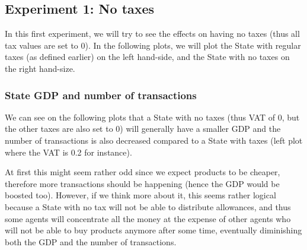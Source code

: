     \subsection{Experiment 1: No taxes}
    In this first experiment, we will try to see the effects on having no taxes (thus all tax values are set to 0). In the following plots, we will plot the State with regular taxes (as defined earlier) on the left hand-side, and the State with no taxes on the right hand-size. 

        \subsubsection{State GDP and number of transactions}

        We can see on the following plots that a State with no taxes (thus VAT of 0, but the other taxes are also set to 0) will generally have a smaller GDP and the number of transactions is also decreased compared to a State with taxes (left plot where the VAT is 0.2 for instance). 
        
        At first this might seem rather odd since we expect products to be cheaper, therefore more transactions should be happening (hence the GDP would be boosted too). However, if we think more about it, this seems rather logical because a State with no tax will not be able to distribute allowances, and thus some agents will concentrate all the money at the expense of other agents who will not be able to buy products anymore after some time, eventually diminishing both the GDP and the number of transactions.

